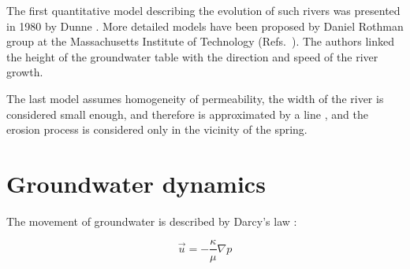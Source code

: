 \documentclass[]{pracamgr}
\begin{document}
    The first quantitative model describing the evolution of such rivers was presented in 1980 by Dunne \cite{dunne1980formation}. More detailed models have been proposed by Daniel Rothman group at the Massachusetts Institute of Technology (Refs.~\cite{petroff2012four, devauchelle2012ramification}). The authors linked the height of the groundwater table with the direction and speed of the river growth.

    The last model assumes homogeneity of permeability, the width of the river is considered small enough, and therefore is approximated by a line \cite{peterson1998singular,carleson2002laplacian,gubiec2008fingered}, and the erosion process is considered only in the vicinity of the spring.

    \section{Groundwater dynamics}

      The movement of groundwater is described by Darcy's law \cite{darcy1856fontaines}:
      
      \begin{equation}
        \vec{u}=-\frac{\kappa}{\mu} \nabla p
      \end{equation}	
      
\end{document}
